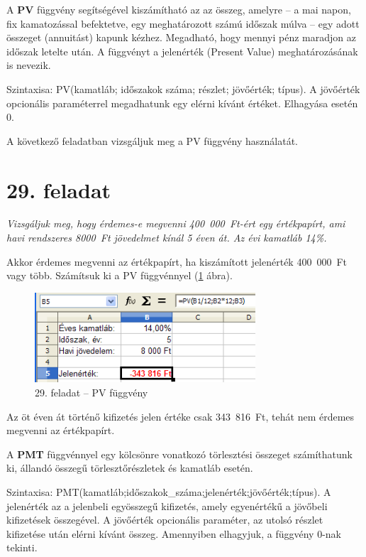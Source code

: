 A \textbf{PV} függvény segítségével kiszámítható az az
összeg, amelyre --  a mai napon, fix kamatozással befektetve, egy
meghatározott számú időszak múlva --  egy adott összeget
(annuitást) kapunk kézhez.  Megadható, hogy mennyi pénz
maradjon az időszak letelte után. A függvényt a
jelenérték (Present Value) meghatározásának is nevezik.

Szintaxisa: PV(kamatláb; időszakok száma; részlet;
jövőérték; típus). A jövőérték opcionális
paraméterrel megadhatunk egy elérni kívánt értéket.
Elhagyása esetén 0.

A következő feladatban vizsgáljuk meg a PV függvény
használatát.


\section{29. feladat}

{\itshape
Vizsgáljuk meg, hogy érdemes-e megvenni 400~000~Ft-ért egy
értékpapírt, ami havi rendszeres 8000~Ft jövedelmet kínál 5
éven át. Az évi kamatláb 14\%.}

Akkor érdemes megvenni az értékpapírt, ha kiszámított
jelenérték 400~000~Ft vagy több. Számítsuk ki a PV
függvénnyel (\ref{29-feladatPV} ábra).

\begin{figure}[!h]
\begin{center}
\includegraphics[width=8.232cm]{oocalcv1-img126.png}
\caption{29.  feladat --  PV függvény}\label{29-feladatPV}
\end{center}
\end{figure}

Az öt éven át történő kifizetés jelen értéke csak
343~816~Ft, tehát nem érdemes megvenni az értékpapírt.

A \textbf{PMT} függvénnyel egy kölcsönre vonatkozó
törlesztési összeget számíthatunk ki, állandó
összegű törlesztőrészletek és kamatláb esetén.

Szintaxisa:
PMT(kamatláb;időszakok\_száma;jelenérték;jövőérték;típus).
A jelenérték az a jelenbeli egyösszegű kifizetés, amely
egyenértékű a jövőbeli kifizetések összegével. A
jövőérték opcionális paraméter, az utolsó részlet
kifizetése után elérni kívánt összeg. Amennyiben elhagyjuk,
a függvény 0-nak tekinti.

